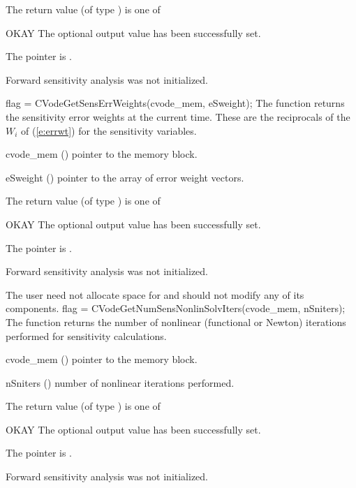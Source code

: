 {
  The return value  (of type ) is one of
  \begin{args}
  \item[OKAY] 
    The optional output value has been successfully set.
  \item[\Id{CVG\_NO\_MEM}]
    The  pointer is .
  \item[\Id{CVG\_NO\_SENS}]
    Forward sensitivity analysis was not initialized.
  \end{args}
}
{}
{
  flag = CVodeGetSensErrWeights(cvode\_mem, eSweight);
}
{
  The function  returns the sensitivity error weights at the
  current time. These are the reciprocals of the $W_i$ of (\ref{e:errwt}) for the
  sensitivity variables.
}
{
  \begin{args}
  \item[cvode\_mem] ()
    pointer to the {\cvodes} memory block.
  \item[eSweight] ()
    pointer to the array of error weight vectors.
  \end{args}
}
{
  The return value  (of type ) is one of
  \begin{args}
  \item[OKAY] 
    The optional output value has been successfully set.
  \item[\Id{CVG\_NO\_MEM}]
    The  pointer is .
  \item[\Id{CVG\_NO\_SENS}]
    Forward sensitivity analysis was not initialized.
  \end{args}
}
{
  The user need not allocate space for  and should not modify
  any of its components.
}
{
  flag = CVodeGetNumSensNonlinSolvIters(cvode\_mem, nSniters);
}
{
  The function  returns the
  number of nonlinear (functional or Newton) iterations performed for 
  sensitivity calculations.
}
{
  \begin{args}
  \item[cvode\_mem] ()
    pointer to the {\cvodes} memory block.
  \item[nSniters] ()
    number of nonlinear iterations performed.
  \end{args}
}
{
  The return value  (of type ) is one of
  \begin{args}
  \item[OKAY] 
    The optional output value has been successfully set.
  \item[\Id{CVG\_NO\_MEM}]
    The  pointer is .
  \item[\Id{CVG\_NO\_SENS}]
    Forward sensitivity analysis was not initialized.
  \end{args}
}
